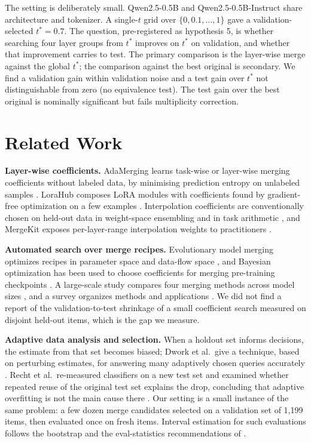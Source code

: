 \documentclass[conference]{IEEEtran}
\begin{document}
The setting is deliberately small. Qwen2.5-0.5B and Qwen2.5-0.5B-Instruct \cite{yang2024qwen25} share architecture and tokenizer. A single-$t$ grid over $\{0,0.1,\dots,1\}$ gave a validation-selected $t^*=0.7$. The question, pre-registered as hypothesis 5, is whether searching four layer groups from $t^*$ improves on $t^*$ on validation, and whether that improvement carries to test. The primary comparison is the layer-wise merge against the global $t^*$; the comparison against the best original is secondary. We find a validation gain within validation noise and a test gain over $t^*$ not distinguishable from zero (no equivalence test). The test gain over the best original is nominally significant but fails multiplicity correction.

\section{Related Work}
\textbf{Layer-wise coefficients.} AdaMerging learns task-wise or layer-wise merging coefficients without labeled data, by minimising prediction entropy on unlabeled samples \cite{yang2023adamerging}. LoraHub composes LoRA modules with coefficients found by gradient-free optimization on a few examples \cite{huang2023lorahub}. Interpolation coefficients are conventionally chosen on held-out data in weight-space ensembling and in task arithmetic \cite{wortsman2022wise,ilharco2022editing,wortsman2022soups}, and MergeKit exposes per-layer-range interpolation weights to practitioners \cite{goddard2024mergekit}.

\textbf{Automated search over merge recipes.} Evolutionary model merging optimizes recipes in parameter space and data-flow space \cite{akiba2024evolutionary}, and Bayesian optimization has been used to choose coefficients for merging pre-training checkpoints \cite{liu2024bayesopt}. A large-scale study compares four merging methods across model sizes \cite{yadav2024matters}, and a survey organizes methods and applications \cite{yang2024survey}. We did not find a report of the validation-to-test shrinkage of a small coefficient search measured on disjoint held-out items, which is the gap we measure.

\textbf{Adaptive data analysis and selection.} When a holdout set informs decisions, the estimate from that set becomes biased; Dwork et al.\ give a technique, based on perturbing estimates, for answering many adaptively chosen queries accurately \cite{dwork2014adaptive}. Recht et al.\ re-measured classifiers on a new test set and examined whether repeated reuse of the original test set explains the drop, concluding that adaptive overfitting is not the main cause there \cite{recht2019imagenet}. Our setting is a small instance of the same problem: a few dozen merge candidates selected on a validation set of 1{,}199 items, then evaluated once on fresh items. Interval estimation for such evaluations follows the bootstrap and the eval-statistics recommendations of \cite{efron1979bootstrap,miller2024errorbars}.
\end{document}
